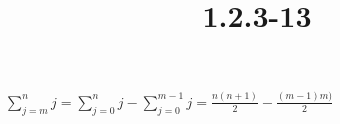 \documentclass{article}
\title{1.2.3-13}
\begin{document}
\maketitle

$\sum_{j=m}^n j = \sum_{j=0}^n j - \sum_{j=0}^{m-1} j = \frac{n(n+1)}{2} - \frac{(m-1)m)}{2}$
\end{document}

